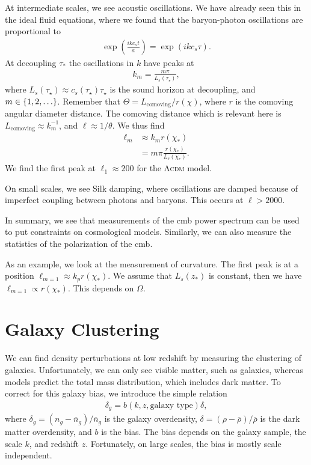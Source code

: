 At intermediate scales, we see acoustic oscillations. We have already seen this in the ideal fluid equations, where we found that the baryon-photon oscillations are proportional to
\begin{align*}
	\exp(\frac{i k c_s t}{a})
	= \exp(i k c_s \tau).
\end{align*}
At decoupling $\tau_*$ the oscillations in $k$ have peaks at
\begin{align*}
	k_m = \frac{m \pi}{L_s(\tau_\star)},
\end{align*}
where $L_s(\tau_\star) \approx c_s(\tau_\star) \tau_\star$ is the sound horizon at decoupling, and $m \in \left\{ {1, 2, \dots} \right\}$.
Remember that $\Theta = L_\text{comoving} / r(\chi)$, where $r$ is the comoving angular diameter distance. The comoving distance which is relevant here is $L_\text{comoving} \approx k_m^{-1}$, and $\ell \approx 1/\theta$. We thus find
\begin{align*}
	\ell_m 
	&\approx k_m r(\chi_*)\\
	&= m \pi \frac{r(\chi_*)}{L_s(\chi_*)}.
\end{align*}
We find the first peak at $\ell_1 \approx 200$ for the \textsc{Λcdm} model.

On small scales, we see Silk damping, where oscillations are damped because of imperfect coupling between photons and baryons. This occurs at $\ell > 2000$.

In summary, we see that measurements of the \ac{cmb} power spectrum can be used to put constraints on cosmological models.
Similarly, we can also measure the statistics of the polarization of the \ac{cmb}.


As an example, we look at the measurement of curvature. The first peak is at a position $\ell_{m=1} \approx k_p r(\chi_*)$. We assume that $L_s(z_*)$ is constant, then we have $\ell_{m=1} \propto r(\chi_*)$. This depends on $\Omega$.






\section{Galaxy Clustering}

We can find density perturbations at low redshift by measuring the clustering of galaxies. Unfortunately, we can only see visible matter, such as galaxies, whereas models predict the total mass distribution, which includes dark matter. To correct for this galaxy bias, we introduce the simple relation
\begin{align*}
	\delta_g = b(k, z, \text{galaxy type}) \delta,
\end{align*}
where
$\delta_g = (n_g - \bar{n}_g)/\bar{n}_g$ is the galaxy overdensity,
$\delta = (\rho-\bar{\rho})/\bar{\rho}$ is the dark matter overdensity,
and $b$ is the bias.
The bias depends on the galaxy sample, the scale $k$, and redshift $z$. Fortunately, on large scales, the bias is mostly scale independent.

